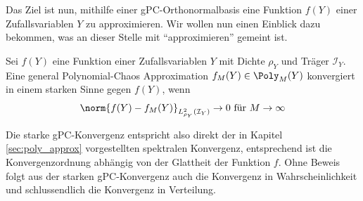 Das Ziel ist nun, mithilfe einer gPC-Orthonormalbasis eine Funktion $f(Y)$ einer Zufallsvariablen $Y$ zu approximieren. Wir wollen nun einen Einblick dazu bekommen, was an dieser Stelle mit "`approximieren"' gemeint ist.
\begin{mathdef}
Sei $f(Y)$ eine Funktion einer Zufallsvariablen $Y$ mit Dichte $\rho_Y$ und Träger $\mathcal{I}_Y$. Eine general Polynomial-Chaos Approximation $f_M(Y)\in\Poly_M(Y)$ konvergiert in einem starken Sinne gegen $f(Y)$, wenn \[\norm{f(Y)-f_M(Y)}_{L_{\rho_Y}^2(\mathcal{I}_Y)}\to 0\text{ für }{M\to\infty}\]
\end{mathdef}
Die starke gPC-Konvergenz entspricht also direkt der in Kapitel \ref{sec:poly_approx} vorgestellten spektralen Konvergenz, entsprechend ist die Konvergenzordnung abhängig von der Glattheit der Funktion $f$. Ohne Beweis folgt aus der starken gPC-Konvergenz auch die Konvergenz in Wahrscheinlichkeit und schlussendlich die Konvergenz in Verteilung.

